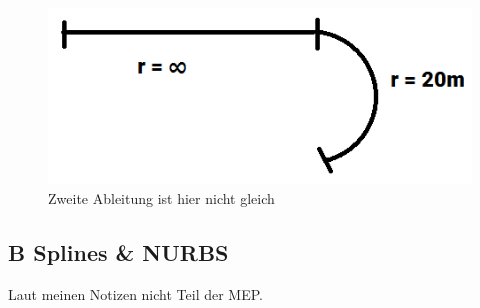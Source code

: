 \begin{figure}[!ht]
	\centering
	\includegraphics[width=0.2\linewidth]{fig/c2_stetigkeit}
	\caption{Zweite Ableitung ist hier nicht gleich}
	\label{fig:c2_stetigkeit}
\end{figure}
\subsection{B Splines \& NURBS}
Laut meinen Notizen nicht Teil der MEP.